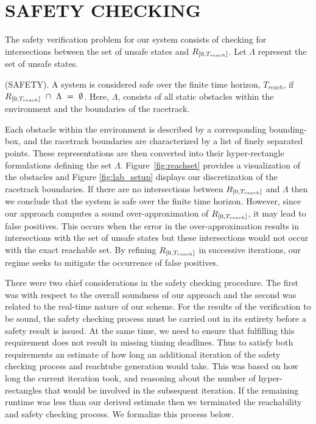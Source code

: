 \documentclass[manuscript,screen,review]{acmart}
\begin{document}
\section{SAFETY CHECKING}

The safety verification problem for our system consists of checking for intersections between the set of unsafe states and $\mathnormal{R}_{[0,T_{reach}]}$. Let $\Lambda$ represent the set of unsafe states.\smallskip

\begin{definition}%
(SAFETY). A system is considered safe over the finite time horizon, $T_{reach}$, if  $\mathnormal{R}_{[0,T_{reach}]} \  \cap \ \Lambda \ = \ \emptyset$. Here, $\Lambda$, consists of all static obstacles within the environment and the boundaries of the racetrack.
\end{definition}%


Each obstacle within the environment is described by a corresponding bounding-box, and the racetrack boundaries are characterized by a list of finely separated points. These representations are then converted into their hyper-rectangle formulations defining the set  $\Lambda$. Figure~\ref{fig:reachset} provides a visualization of the obstacles and Figure \ref{fig:lab_setup} displays our discretization of the racetrack boundaries. If there are no intersections between $\mathnormal{R}_{[0,T_{reach}]}$ and $\Lambda$  then we conclude that the system is safe over the finite time horizon. However, since our approach computes a sound over-approximation of $\mathnormal{R}_{[0,T_{reach}]}$, it may lead to false positives. This occurs when the error in the over-approximation results in intersections with the set of unsafe states but these intersections would not occur with the exact reachable set. By refining $\mathnormal{R}_{[0,T_{reach}]}$ in successive iterations, our regime seeks to mitigate the occurrence of false positives.  


There were two chief considerations in the safety checking procedure. The first was with respect to the overall soundness of our approach and the second was related to the real-time nature of our scheme. For the results of the verification to be sound, the safety checking process must be carried out in its entirety before a safety result is issued.  At the same time, we need to ensure that fulfilling this requirement does not result in missing timing deadlines. Thus to satisfy both requirements an estimate of how long an additional iteration of the safety checking process and reachtube generation would take. This was based on how long the current iteration took, and reasoning about the number of hyper-rectangles that would be involved in the subsequent iteration. If the remaining runtime was less than our derived estimate then we terminated the reachability and safety checking process. We formalize this process below.
\end{document}
